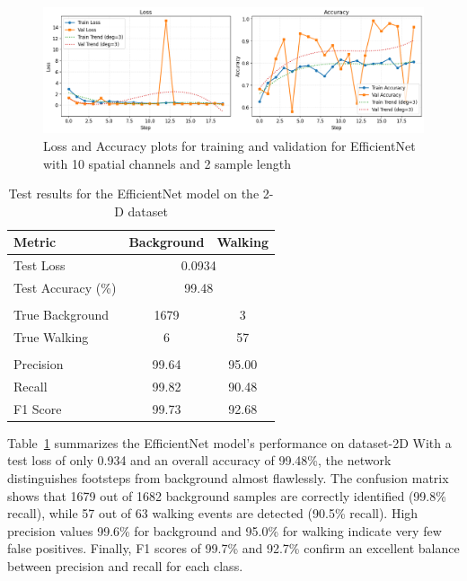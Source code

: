 \begin{figure}[h]
    \centering
    \includegraphics[width=\linewidth]{Bilder/jpg/eff_2d_train.png}
    \caption{Loss and Accuracy plots for training and validation for EfficientNet with 10 spatial channels and 2 sample length}
    \label{eff_2d_train}
\end{figure}

\begin{table}[ht]
    \centering
    \caption{Test results for the EfficientNet model on the 2-D dataset}
    \label{eff_2d_test}
    \begin{tabular}{lcc}
      \toprule
      \textbf{Metric}            & \textbf{Background} & \textbf{Walking} \\
      \midrule
      Test Loss                  & \multicolumn{2}{c}{0.0934}          \\
      Test Accuracy (\%)         & \multicolumn{2}{c}{99.48}           \\
      \addlinespace
      \multicolumn{3}{l}{\textbf{Confusion Matrix}} \\
      \quad True Background      & 1679                & 3               \\
      \quad True Walking         & 6                   & 57              \\
      \addlinespace
      \multicolumn{3}{l}{\textbf{Per-class Precision, Recall, F1 (\%)}} \\
      Precision                  & 99.64               & 95.00           \\
      Recall                     & 99.82               & 90.48           \\
      F1 Score                   & 99.73               & 92.68           \\
      \bottomrule
    \end{tabular}
  \end{table}

Table~\ref{eff_2d_test} summarizes the EfficientNet model's performance on dataset-2D With a test loss of only 0.934 and an overall accuracy of 99.48\%, the network distinguishes footsteps from background almost flawlessly. The confusion matrix shows that 1679 out of 1682 background samples are correctly identified (99.8\% recall), while 57 out of 63 walking events are detected (90.5\% recall). High precision values 99.6\% for background and 95.0\% for walking indicate very few false positives. Finally, F1 scores of 99.7\% and 92.7\% confirm an excellent balance between precision and recall for each class.

